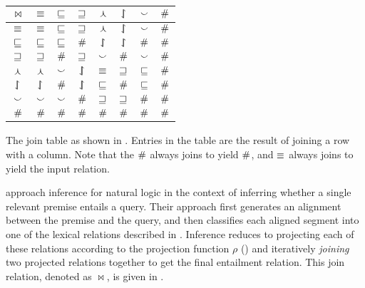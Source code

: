 
\begin{table}[t]
	\begin{center}
	\begin{tabular}{|c||c|c|c|c|c|c|c|}
    \hline
    $\bowtie$ & $\equiv$ & $\sqsubseteq$ & $\sqsupseteq$ & $\curlywedge$ & $\downharpoonleft\hspace{-1.25mm}\upharpoonright$ & $\smallsmile$ & $\#$ \\
    \hline
    $\equiv$ & $\equiv$ & $\sqsubseteq$ & $\sqsupseteq$ & $\curlywedge$ & $\downharpoonleft\hspace{-1.25mm}\upharpoonright$ & $\smallsmile$ & $\#$ \\
    $\sqsubseteq$ & $\sqsubseteq$ & $\sqsubseteq$ & $\#$ & $\downharpoonleft\hspace{-1.25mm}\upharpoonright$ & $\downharpoonleft\hspace{-1.25mm}\upharpoonright$ & $\#$ & $\#$ \\
    $\sqsupseteq$ & $\sqsupseteq$ & $\#$ & $\sqsupseteq$ & $\smallsmile$ & $\#$ & $\smallsmile$ & $\#$  \\
    $\curlywedge$ & $\curlywedge$ & $\smallsmile$ & $\downharpoonleft\hspace{-1.25mm}\upharpoonright$ & $\equiv$ & $\sqsupseteq$ & $\sqsubseteq$ & $\#$  \\
    $\downharpoonleft\hspace{-1.25mm}\upharpoonright$ & $\downharpoonleft\hspace{-1.25mm}\upharpoonright$ & $\#$ & $\downharpoonleft\hspace{-1.25mm}\upharpoonright$ & $\sqsubseteq$ & $\#$ & $\sqsubseteq$ & $\#$  \\
    $\smallsmile$ & $\smallsmile$ & $\smallsmile$ & $\#$ & $\sqsupseteq$ & $\sqsupseteq$ & $\#$ & $\#$  \\
    $\#$ & $\#$ & $\#$ & $\#$ & $\#$ & $\#$ & $\#$ & $\#$ \\
    \hline
	\end{tabular}
  {
    The join table as shown in .
    Entries in the table are the result of joining a row with a
      column.
    Note that the $\#$ always joins to yield $\#$,
    and $\equiv$ always joins to yield the input relation.
		\label{tab:join}
	}
	\end{center}
\end{table}

 approach inference for natural logic in
  the context of inferring whether a single relevant premise entails
  a query.
Their approach first generates an alignment between the premise
  and the query, and then classifies each aligned segment into one of
  the lexical relations described in .
Inference reduces to projecting each of these relations
  according to the projection function $\rho$ ()
  and iteratively \textit{joining}  two projected relations together to 
  get the final entailment relation.
This join relation, denoted as $\bowtie$, is given in .


